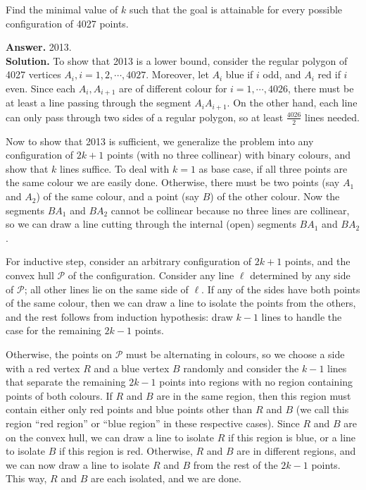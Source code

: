 \documentclass[11pt,a4paper]{article}
\begin{document}
\begin{enumerate}
	Find the minimal value of $k$ such that the goal is attainable for every possible configuration of 4027 points.
	
	\textbf{Answer.} 2013. \\
	\textbf{Solution.} To show that 2013 is a lower bound, consider the regular polygon of 4027 vertices $A_i, i=1, 2, \cdots, 4027$. 
	Moreover, let $A_i$ blue if $i$ odd, and $A_i$ red if $i$ even. 
	Since each $A_i, A_{i+1}$ are of different colour for $i=1, \cdots , 4026$, there must be at least a line passing through the segment $A_{i}A_{i+1}$. 
	On the other hand, each line can only pass through two sides of a regular polygon, so at least $\frac{4026}{2}$ lines needed. 
	
	Now to show that 2013 is sufficient, we generalize the problem into any configuration of $2k+1$ points (with no three collinear) with binary colours, and show that $k$ lines suffice. To deal with $k=1$ as base case, if all three points are the same colour we are easily done. 
	Otherwise, there must be two points (say $A_1$ and $A_2$) of the same colour, and a point (say $B$) of the other colour. Now the segments $BA_1$ and $BA_2$ cannot be collinear because no three lines are collinear, so we can draw a line cutting through the internal (open) segments $BA_1$ and $BA_2$. 
	
	For inductive step, consider an arbitrary configuration of $2k+1$ points, and the convex hull $\mathcal{P}$ of the configuration. Consider any line $\ell$ determined by any side of $\mathcal{P}$; all other lines lie on the same side of $\ell$. If any of the sides have both points of the same colour, then we can draw a line to isolate the points from the others, and the rest follows from induction hypothesis: draw $k-1$ lines to handle the case for the remaining $2k-1$ points. 
	
	Otherwise, the points on $\mathcal{P}$ must be alternating in colours, so we choose a side with a red vertex $R$ and a blue vertex $B$ randomly and consider the $k-1$ lines that separate the remaining $2k-1$ points into regions with no region containing points of both colours. 
	If $R$ and $B$ are in the same region, then this region must contain either only red points and blue points other than $R$ and $B$ (we call this region ``red region'' or ``blue region'' in these respective cases). Since $R$ and $B$ are on the convex hull, we can draw a line to isolate $R$ if this region is blue, or a line to isolate $B$ if this region is red. 
	Otherwise, $R$ and $B$ are in different regions, and we can now draw a line to isolate $R$ and $B$ from the rest of the $2k-1$ points. This way, $R$ and $B$ are each isolated, and we are done. 
	

\end{enumerate}
\end{document}
